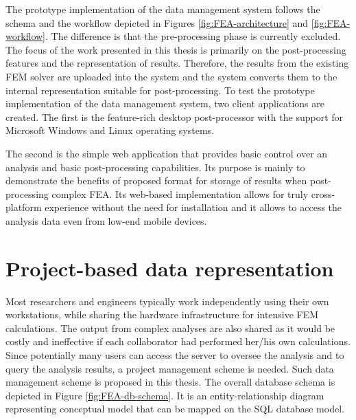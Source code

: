 The prototype implementation of the data management system follows the schema and the workflow depicted in Figures \ref{fig:FEA-architecture} and \ref{fig:FEA-workflow}. The difference is that the pre-processing phase is currently excluded. The focus of the work presented in this thesis is primarily on the post-processing features and the representation of results. Therefore, the results from the existing FEM solver are uploaded into the system and the system converts them to the internal representation suitable for post-processing. To test the prototype implementation of the data management system, two client applications are created. The first is the feature-rich desktop post-processor with the support for Microsoft Windows and Linux operating systems.

The second is the simple web application that provides basic control over an analysis and basic post-processing capabilities. Its purpose is mainly to demonstrate the benefits of proposed format for storage of results when post-processing complex FEA. Its web-based implementation allows for truly cross-platform experience without the need for installation and it allows to access the analysis data even from low-end mobile devices.

\section{Project-based data representation}
\label{sec:project-db-schema}

Most researchers and engineers typically work independently using their own workstations, while sharing the hardware infrastructure for intensive FEM calculations. The output from complex analyses are also shared as it would be costly and ineffective if each collaborator had performed her/his own calculations. Since potentially many users can access the server to oversee the analysis and to query the analysis results, a project management scheme is needed. Such data management scheme is proposed in this thesis. The overall database schema is depicted in Figure \ref{fig:FEA-db-schema}. It is an entity-relationship diagram representing conceptual model that can be mapped on the SQL database model.

